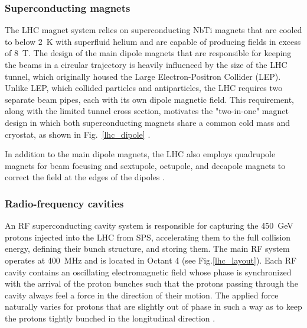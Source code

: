 \subsubsection{Superconducting magnets}
The LHC magnet system relies on superconducting NbTi magnets that are cooled to below \SI{2}{\K} with superfluid helium and are capable of producing fields in excess of \SI{8}{\tesla}. The design of the main dipole magnets that are responsible for keeping the beams in a circular trajectory is heavily influenced by the size of the LHC tunnel, which originally housed the Large Electron-Positron Collider (LEP). Unlike LEP, which collided particles and antiparticles, the LHC requires two separate beam pipes, each with its own dipole magnetic field. This requirement, along with the limited tunnel cross section, motivates the "two-in-one" magnet design in which both superconducting magnets share a common cold mass and cryostat, as shown in Fig.~\ref{lhc_dipole} \cite{lhc_machine}.

In addition to the main dipole magnets, the LHC also employs quadrupole magnets for beam focusing and sextupole, octupole, and decapole magnets to correct the field at the edges of the dipoles \cite{lhc_machine}.



\subsubsection{Radio-frequency cavities}
An RF superconducting cavity system is responsible for capturing the \SI{450}{\GeV} protons injected into the LHC from SPS, accelerating them to the full collision energy, defining their bunch structure, and storing them. The main RF system operates at \SI{400}{\MHz} and is located in Octant 4 (see Fig.\ref{lhc_layout}). Each RF cavity contains an oscillating electromagnetic field whose phase is synchronized with the arrival of the proton bunches such that the protons passing through the cavity always feel a force in the direction of their motion. The applied force naturally varies for protons that are slightly out of phase in such a way as to keep the protons tightly bunched in the longitudinal direction \cite{lhc_machine}.

\pagebreak
